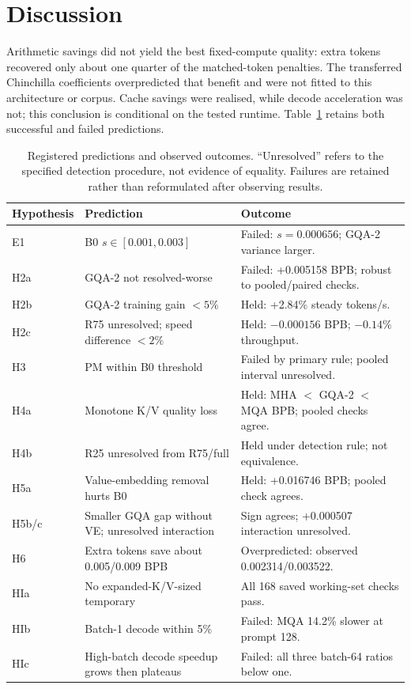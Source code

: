 \documentclass[10pt,twocolumn]{article}
\begin{document}
\section{Discussion}
Arithmetic savings did not yield the best fixed-compute quality: extra tokens recovered only about one quarter of
the matched-token penalties. The transferred Chinchilla coefficients overpredicted that benefit and were not fitted
to this architecture or corpus. Cache savings were realised, while decode acceleration was not; this conclusion is
conditional on the tested runtime. Table~\ref{tab:hypotheses} retains both successful and failed predictions.

\begin{table}[!t]
\centering\small
\caption{Registered predictions and observed outcomes. ``Unresolved'' refers to the specified detection procedure,
not evidence of equality. Failures are retained rather than reformulated after observing results.}
\label{tab:hypotheses}
\begin{tabularx}{\linewidth}{@{}l>{\raggedright\arraybackslash}X>{\raggedright\arraybackslash}X@{}}
\toprule
Hypothesis & Prediction & Outcome\\
\midrule
E1 & B0 $s\in[0.001,0.003]$ & Failed: $s=0.000656$; GQA-2 variance larger.\\
H2a & GQA-2 not resolved-worse & Failed: +0.005158 BPB; robust to pooled/paired checks.\\
H2b & GQA-2 training gain $<5\%$ & Held: +2.84\% steady tokens/s.\\
H2c & R75 unresolved; speed difference $<2\%$ & Held: $-0.000156$ BPB; $-0.14\%$ throughput.\\
H3 & PM within B0 threshold & Failed by primary rule; pooled interval unresolved.\\
H4a & Monotone K/V quality loss & Held: MHA $<$ GQA-2 $<$ MQA BPB; pooled checks agree.\\
H4b & R25 unresolved from R75/full & Held under detection rule; not equivalence.\\
H5a & Value-embedding removal hurts B0 & Held: +0.016746 BPB; pooled check agrees.\\
H5b/c & Smaller GQA gap without VE; unresolved interaction & Sign agrees; +0.000507 interaction unresolved.\\
H6 & Extra tokens save about 0.005/0.009 BPB & Overpredicted: observed 0.002314/0.003522.\\
HIa & No expanded-K/V-sized temporary & All 168 saved working-set checks pass.\\
HIb & Batch-1 decode within 5\% & Failed: MQA 14.2\% slower at prompt 128.\\
HIc & High-batch decode speedup grows then plateaus & Failed: all three batch-64 ratios below one.\\
\bottomrule
\end{tabularx}
\end{table}
\end{document}
